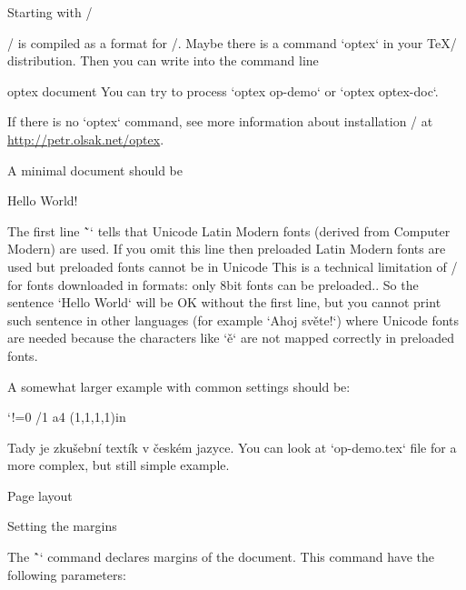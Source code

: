 

\let\new=\relax

\sec Starting with \OpTeX/

\new
\OpTeX/ is compiled as a format for \LuaHBTeX/. Maybe there is a command
`optex` in your \TeX/ distribution. Then you can write into the command line

\begtt
optex document
\endtt
%
You can try to process `optex op-demo` or `optex optex-doc`.

If there is no `optex` command, see more information about installation
\OpTeX/ at \url{http://petr.olsak.net/optex}.

A minimal document should be

\begtt
\fontfam[LMfonts]
Hello World! \bye
\endtt

The first line \~`\fontfam[LMfonts]` tells that Unicode Latin Modern
fonts (derived from Computer Modern) are used. If you omit this line then
preloaded Latin Modern fonts are used but preloaded fonts cannot be in
Unicode\fnote
{This is a technical limitation of \LuaTeX/ for fonts downloaded in formats:
only 8bit fonts can be preloaded.}.
So the sentence `Hello World` will be OK without the first line, but you
cannot print such sentence in other languages (for example `Ahoj světe!`)
where Unicode fonts are needed
because the characters like `ě` are not mapped correctly in preloaded
fonts.

A somewhat larger example with common settings should be:

\begtt \catcode`!=0
\fontfam[Termes]  %
\typosize[11/13]  %
\margins/1 a4 (1,1,1,1)in %
\cslang           %

Tady je zkušební textík v českém jazyce.
\bye
\endtt
%
You can look at `op-demo.tex` file for a more complex, but still simple example.

\sec Page layout

\secc[marg] Setting the margins

The \^`\margins` command declares margins of the document. This command have
the following parameters:

